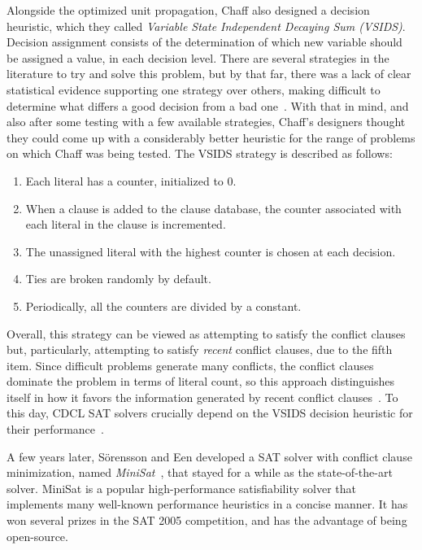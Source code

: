 Alongside the optimized unit propagation, Chaff also designed a decision
heuristic, which they called \emph{Variable State Independent Decaying Sum
(VSIDS)}. Decision assignment consists of the determination of which new
variable should be assigned a value, in each decision level. There are several
strategies in the literature to try and solve this problem, but by that far,
there was a lack of clear statistical evidence supporting one strategy over
others, making difficult to determine what differs a good decision from a bad
one~\cite{moskewicz2001chaff}. With that in mind, and also after some testing
with a few available strategies, Chaff's designers thought they could come up
with a considerably better heuristic for the range of problems on which Chaff
was being tested. The VSIDS strategy is described as follows:

\begin{enumerate}
    \item Each literal has a counter, initialized to 0.
    \item When a clause is added to the clause database, the counter associated with
        each literal in the clause is incremented.
    \item The unassigned literal with the highest counter is chosen at each
        decision.
    \item Ties are broken randomly by default.
    \item Periodically, all the counters are divided by a constant.
\end{enumerate}

Overall, this strategy can be viewed as attempting to satisfy the conflict
clauses but, particularly, attempting to satisfy \emph{recent} conflict clauses,
due to the fifth item. Since difficult problems generate many conflicts, the
conflict clauses dominate the problem in terms of literal count, so this
approach distinguishes itself in how it favors the information generated by
recent conflict clauses~\cite{moskewicz2001chaff}. To this day, CDCL SAT solvers
crucially depend on the VSIDS decision heuristic for their
performance~\cite{vsidsincdcl}. 

A few years later, S\"orensson and Een developed a SAT solver with conflict
clause minimization, named \emph{MiniSat}~\cite{minisat}, that stayed for a
while as the state-of-the-art solver. MiniSat is a popular high-performance
satisfiability solver that implements many well-known performance heuristics in
a concise manner. It has won several prizes in the SAT 2005 competition, and has
the advantage of being open-source. 

